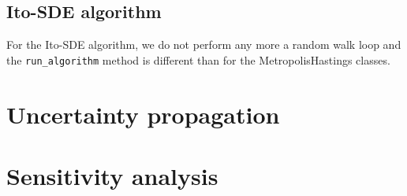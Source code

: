 \documentclass[a4paper,11pt]{article}
\begin{document}
\subsection{Ito-SDE algorithm}

For the Ito-SDE algorithm, we do not perform any more a random walk loop and the \texttt{run\_algorithm} method is different than for the MetropolisHastings classes. 



\section{Uncertainty propagation} 


\section{Sensitivity analysis} 


 

\end{document}
